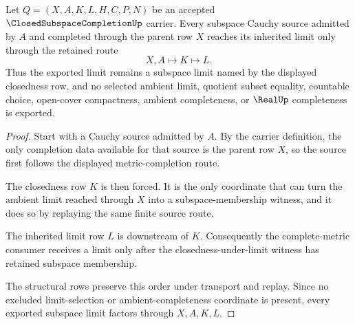 
\begin{theorem}
\label{thm:closed-subspace-completion-limit-retention}
Let $Q=(X,A,K,L,H,C,P,N)$ be an accepted $\ClosedSubspaceCompletionUp$ carrier. Every subspace Cauchy source admitted by $A$ and completed through the parent row $X$ reaches its inherited limit only through the retained route
$$
X,A \longmapsto K \longmapsto L .
$$
Thus the exported limit remains a subspace limit named by the displayed closedness row, and no selected ambient limit, quotient subset equality, countable choice, open-cover compactness, ambient completeness, or $\RealUp$ completeness is exported.
\end{theorem}
\begin{proof}
Start with a Cauchy source admitted by $A$. By the carrier definition, the only completion data available for that source is the parent row $X$, so the source first follows the displayed metric-completion route.

The closedness row $K$ is then forced. It is the only coordinate that can turn the ambient limit reached through $X$ into a subspace-membership witness, and it does so by replaying the same finite source route.

The inherited limit row $L$ is downstream of $K$. Consequently the complete-metric consumer receives a limit only after the closedness-under-limit witness has retained subspace membership.

The structural rows preserve this order under transport and replay. Since no excluded limit-selection or ambient-completeness coordinate is present, every exported subspace limit factors through $X,A,K,L$.
\end{proof}

